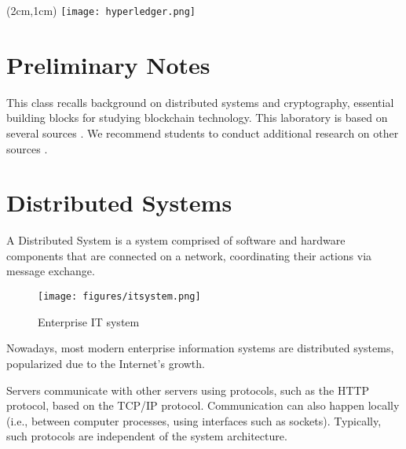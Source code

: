 \documentclass[12pt,a4paper]{article}
\begin{document}
\textblockorigin{-34pt}{-12pt}
\begin{textblock*}{10cm}(2cm,1cm)
\texttt{[image: hyperledger.png]}
\end{textblock*}

\section*{Preliminary Notes}
This class recalls background on distributed systems and cryptography, essential building blocks for studying blockchain technology. This laboratory is based on several sources \cite{dscd,sdist2017,Wong2014,Ousterhout_presentation,Verissimo2001,correia2019byzantine,raft_paper}. We recommend students to conduct additional research on other sources \cite{mit,princeton}.





\section{Distributed Systems}
\label{sec:ds}
A Distributed System is a system comprised of software and hardware components that are connected on a network, coordinating their actions via message exchange.

\begin{figure}[h!]
\centering
\texttt{[image: figures/itsystem.png]}
\caption{Enterprise IT system \cite{Wong2014}}
\label{fig:internet}
\end{figure}

Nowadays, most modern enterprise information systems are distributed systems, popularized due to the Internet's growth.


Servers communicate with other servers using protocols, such as the HTTP protocol, based on the TCP/IP protocol. Communication can also happen locally (i.e., between computer processes, using interfaces such as sockets). Typically, such protocols are independent of the system architecture.
\end{document}
